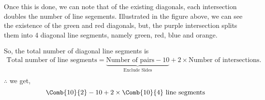 \begin{exampletcb}


Once this is done, we can note that of the existing diagonals, each intersection doubles the number of line segements. Illustrated in the figure above, we can see the existence of the green and red diagonals, but, the purple intersection splits them into 4 diagonal line segments, namely green, red, blue and orange.

So, the total number of diagonal line segments is
\begin{align*}
    \text{Total number of line segments} =
    \underbrace{\text{Number of pairs}- 10}_{\text{Exclude Sides}} + 2 \times \text{Number of intersections}. \\
\end{align*}
\mbox{\(\therefore \)} we get,
\begin{equation*}
    \Comb{10}{2} - 10 + 2 \times \Comb{10}{4} \text{ line segments}
\end{equation*}
\end{exampletcb}

